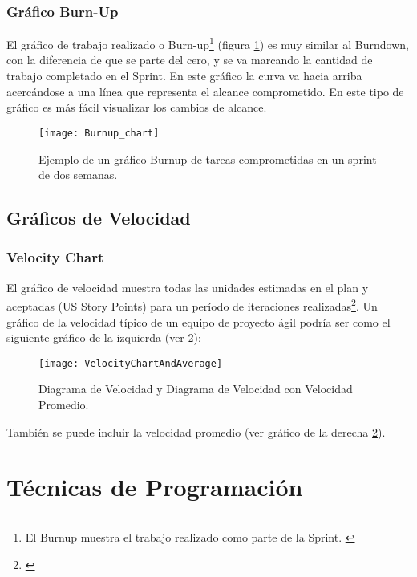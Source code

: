 \subsubsection{Gráfico Burn-Up}

El gráfico de trabajo realizado o Burn-up\footnote{El Burnup muestra el trabajo realizado como parte de la Sprint. \cite{SBOK-2013}} (figura \ref{fig:Burnup_chart}) es muy similar al Burndown, con la diferencia de que se parte del cero, y se va marcando la cantidad de trabajo completado en el Sprint. En este gráfico la curva va hacia arriba acercándose a una línea que representa el alcance comprometido. En este tipo de gráfico es más fácil visualizar los cambios de alcance.

\begin{figure}[h]
  \centering
  \texttt{[image: Burnup\_chart]}
  \caption{Ejemplo de un gráfico Burnup de tareas comprometidas en un sprint de dos semanas.}
  \centering
  \label{fig:Burnup_chart} %
\end{figure}


\subsection{Gráficos de Velocidad}

\subsubsection{Velocity Chart}

El gráfico de velocidad muestra todas las unidades estimadas en el plan y aceptadas (US Story Points) para un período de iteraciones realizadas\footnote{\cite{Scrum-Alliance-2014}}. Un gráfico de la velocidad típico de un equipo de proyecto ágil podría ser como el siguiente gráfico de la izquierda (ver \ref{fig:VelocityChartAndAverage}):

\begin{figure}[h]
  \centering
  \texttt{[image: VelocityChartAndAverage]}
  \caption{Diagrama de Velocidad y Diagrama de Velocidad con Velocidad Promedio.}
  \centering
  \label{fig:VelocityChartAndAverage} %
\end{figure}

También se puede incluir la velocidad promedio (ver gráfico de la derecha \ref{fig:VelocityChartAndAverage}).

\newpage
\section{Técnicas de Programación}

